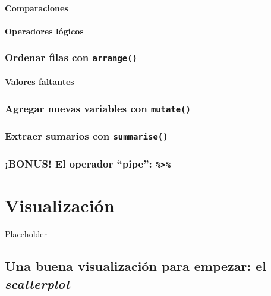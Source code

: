 \documentclass[]{book}
\begin{document}
\subsubsection{Comparaciones}\label{comparaciones}

\subsubsection{Operadores lógicos}\label{operadores-logicos}

\subsection{\texorpdfstring{Ordenar filas con
\texttt{arrange()}}{Ordenar filas con arrange()}}\label{ordenar-filas-con-arrange}

\subsubsection{Valores faltantes}\label{valores-faltantes}

\subsection{\texorpdfstring{Agregar nuevas variables con
\texttt{mutate()}}{Agregar nuevas variables con mutate()}}\label{agregar-nuevas-variables-con-mutate}

\subsection{\texorpdfstring{Extraer sumarios con
\texttt{summarise()}}{Extraer sumarios con summarise()}}\label{extraer-sumarios-con-summarise}

\subsection{\texorpdfstring{¡BONUS! El operador ``pipe'':
\texttt{\%\textgreater{}\%}}{¡BONUS! El operador pipe: \%\textgreater{}\%}}\label{bonus-el-operador-pipe}

\chapter{Visualización}\label{visualizacion}

Placeholder

\section{\texorpdfstring{Una buena visualización para empezar: el
\emph{scatterplot}}{Una buena visualización para empezar: el scatterplot}}\label{una-buena-visualizacion-para-empezar-el-scatterplot}
\end{document}
